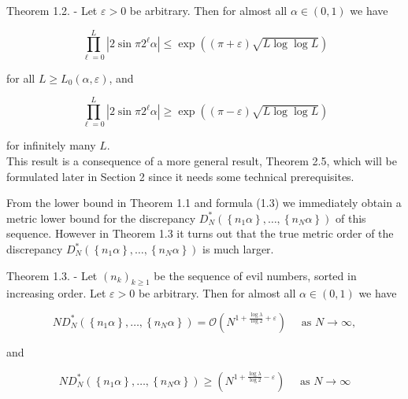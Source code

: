 \documentclass[10pt]{article}
\begin{document}
Theorem 1.2. - Let $\varepsilon>0$ be arbitrary. Then for almost all $\alpha \in(0,1)$ we have


\begin{equation*}
\prod_{\ell=0}^{L}\left|2 \sin \pi 2^{\ell} \alpha\right| \leqslant \exp ((\pi+\varepsilon) \sqrt{L \log \log L}) \tag{1.6}
\end{equation*}


for all $L \geqslant L_{0}(\alpha, \varepsilon)$, and


\begin{equation*}
\prod_{\ell=0}^{L}\left|2 \sin \pi 2^{\ell} \alpha\right| \geqslant \exp ((\pi-\varepsilon) \sqrt{L \log \log L}) \tag{1.7}
\end{equation*}


for infinitely many $L$.\\
This result is a consequence of a more general result, Theorem 2.5, which will be formulated later in Section 2 since it needs some technical prerequisites.

From the lower bound in Theorem 1.1 and formula (1.3) we immediately obtain a metric lower bound for the discrepancy $D_{N}^{*}\left(\left\{n_{1} \alpha\right\}, \ldots,\left\{n_{N} \alpha\right\}\right)$ of this sequence. However in Theorem 1.3 it turns out that the true metric order of the discrepancy $D_{N}^{*}\left(\left\{n_{1} \alpha\right\}, \ldots,\left\{n_{N} \alpha\right\}\right)$ is much larger.

Theorem 1.3. - Let $\left(n_{k}\right)_{k \geqslant 1}$ be the sequence of evil numbers, sorted in increasing order. Let $\varepsilon>0$ be arbitrary. Then for almost all $\alpha \in(0,1)$ we have


\begin{equation*}
N D_{N}^{*}\left(\left\{n_{1} \alpha\right\}, \ldots,\left\{n_{N} \alpha\right\}\right)=\mathcal{O}\left(N^{1+\frac{\log \lambda}{\log 2}+\varepsilon}\right) \quad \text { as } N \rightarrow \infty, \tag{1.8}
\end{equation*}


and


\begin{equation*}
N D_{N}^{*}\left(\left\{n_{1} \alpha\right\}, \ldots,\left\{n_{N} \alpha\right\}\right) \geqslant\left(N^{1+\frac{\log \lambda}{\log 2}-\varepsilon}\right) \quad \text { as } N \rightarrow \infty \tag{1.9}
\end{equation*}
\end{document}
